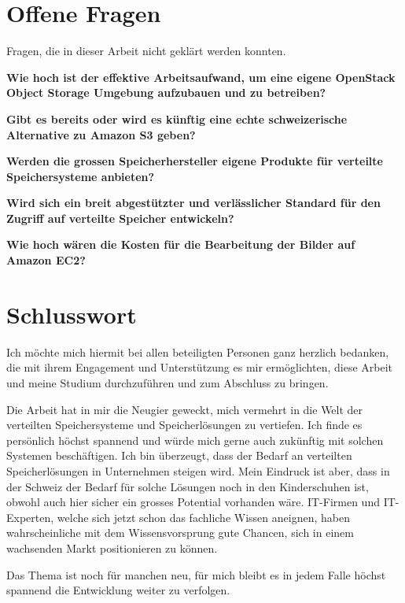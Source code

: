 \section{Offene Fragen}

Fragen, die in dieser Arbeit nicht geklärt werden konnten.

\textbf{Wie hoch ist der effektive Arbeitsaufwand, um eine eigene OpenStack Object Storage Umgebung aufzubauen und zu betreiben?}

\textbf{Gibt es bereits oder wird es künftig eine echte schweizerische Alternative zu Amazon S3 geben?}

\textbf{Werden die grossen Speicherhersteller eigene Produkte für verteilte Speichersysteme anbieten?}

\textbf{Wird sich ein breit abgestützter und verlässlicher Standard für den Zugriff auf verteilte Speicher entwickeln?}

\textbf{Wie hoch wären die Kosten für die Bearbeitung der Bilder auf Amazon EC2?}


\section{Schlusswort}
Ich möchte mich hiermit bei allen beteiligten Personen ganz herzlich bedanken, die mit ihrem Engagement und Unterstützung es mir ermöglichten, diese Arbeit und meine Studium durchzuführen und zum Abschluss zu bringen. 

Die Arbeit hat in mir die Neugier geweckt, mich vermehrt in die Welt der verteilten Speichersysteme und Speicherlösungen zu vertiefen. Ich finde es persönlich höchst spannend und würde mich gerne auch zukünftig mit solchen Systemen beschäftigen. Ich bin überzeugt, dass der Bedarf an verteilten Speicherlösungen in Unternehmen steigen wird. Mein Eindruck ist aber, dass in der Schweiz der Bedarf für solche Lösungen noch in den Kinderschuhen ist, obwohl auch hier sicher ein grosses Potential vorhanden wäre. IT-Firmen und IT-Experten, welche sich jetzt schon das fachliche Wissen aneignen, haben wahrscheinliche mit dem Wissensvorsprung gute Chancen, sich in einem wachsenden Markt positionieren zu können. 

Das Thema ist noch für manchen neu, für mich bleibt es in jedem Falle höchst spannend die Entwicklung weiter zu verfolgen. 
